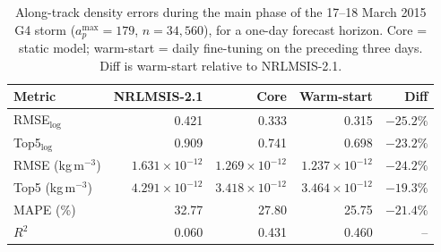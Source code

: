 \begin{table}[htbp]
\centering
\caption{Along-track density errors during the main phase of the 17--18 March
2015 G4 storm ($a_p^{\max}=179$, $n=34{,}560$), for a one-day forecast horizon.
Core = static model; warm-start = daily fine-tuning on the preceding three days.
Diff is warm-start relative to NRLMSIS-2.1.}
\label{tab:storm_mainphase}
\begin{tabular}{lrrrr}
\hline
\textbf{Metric} & \textbf{NRLMSIS-2.1} & \textbf{Core} & \textbf{Warm-start} & \textbf{Diff} \\
\hline
RMSE$_{\log}$          & 0.421 & 0.333 & 0.315 & $-25.2\%$ \\
Top5$_{\log}$          & 0.909 & 0.741 & 0.698 & $-23.2\%$ \\
RMSE (kg\,m$^{-3}$)    & $1.631\times10^{-12}$ & $1.269\times10^{-12}$ & $1.237\times10^{-12}$ & $-24.2\%$ \\
Top5 (kg\,m$^{-3}$)    & $4.291\times10^{-12}$ & $3.418\times10^{-12}$ & $3.464\times10^{-12}$ & $-19.3\%$ \\
MAPE (\%)              & 32.77 & 27.80 & 25.75 & $-21.4\%$ \\
$R^2$                  & 0.060 & 0.431 & 0.460 & -- \\
\hline
\end{tabular}
\end{table}
